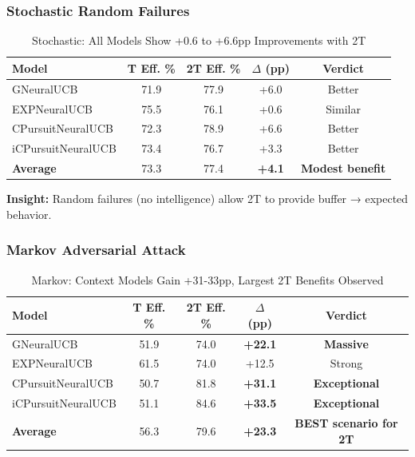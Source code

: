 \documentclass[11pt,a4paper]{article}
\newcommand{\success}[1]{\textcolor{successcolor}{\textbf{#1}}}
\begin{document}
\subsubsection{Stochastic Random Failures}

\vspace{-0.4cm}

\begin{table}[H]
\scriptsize
\centering
\begin{tabular}{lcccc}
\toprule
\textbf{Model} & \textbf{T Eff. \%} & \textbf{2T Eff. \%} & \textbf{$\Delta$ (pp)} & \textbf{Verdict} \\
\midrule
GNeuralUCB & 71.9 & 77.9 & +6.0 & Better \\
EXPNeuralUCB & 75.5 & 76.1 & +0.6 & Similar \\
CPursuitNeuralUCB & 72.3 & 78.9 & +6.6 & Better \\
iCPursuitNeuralUCB & 73.4 & 76.7 & +3.3 & Better \\
\midrule
\textbf{Average} & 73.3 & 77.4 & \success{+4.1} & \success{Modest benefit} \\
\bottomrule
\end{tabular}
\vspace{-0.2cm}
\caption{Stochastic: All Models Show +0.6 to +6.6pp Improvements with 2T}
\end{table}

\vspace{-0.2cm}

\textbf{Insight:} Random failures (no intelligence) allow 2T to provide buffer → expected behavior.

\subsubsection{Markov Adversarial Attack}

\vspace{-0.4cm}

\begin{table}[H]
\scriptsize
\centering
\begin{tabular}{lcccc}
\toprule
\textbf{Model} & \textbf{T Eff. \%} & \textbf{2T Eff. \%} & \textbf{$\Delta$ (pp)} & \textbf{Verdict} \\
\midrule
GNeuralUCB & 51.9 & 74.0 & \success{+22.1} & \success{Massive} \\
EXPNeuralUCB & 61.5 & 74.0 & +12.5 & Strong \\
CPursuitNeuralUCB & 50.7 & 81.8 & \success{+31.1} & \success{Exceptional} \\
iCPursuitNeuralUCB & 51.1 & 84.6 & \success{+33.5} & \success{Exceptional} \\
\midrule
\textbf{Average} & 56.3 & 79.6 & \success{+23.3} & \success{BEST scenario for 2T} \\
\bottomrule
\end{tabular}
\vspace{-0.2cm}
\caption{Markov: Context Models Gain +31-33pp, Largest 2T Benefits Observed}
\end{table}
\end{document}
